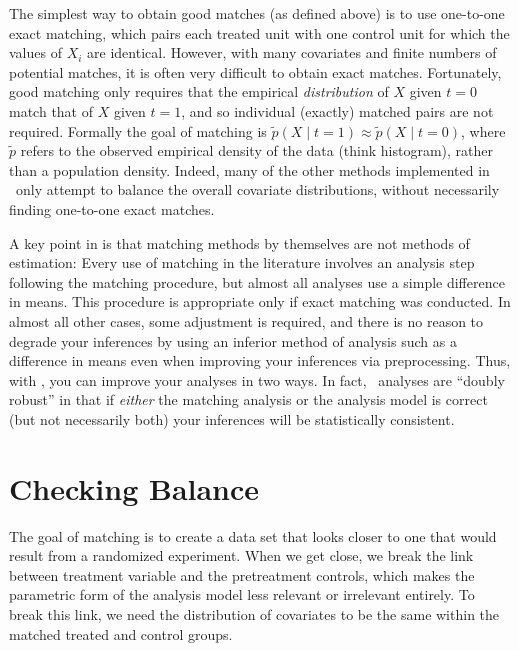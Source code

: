 The simplest way to obtain good matches (as defined above) is to use
one-to-one exact matching, which pairs each treated unit with one
control unit for which the values of $X_i$ are identical.  However,
with many covariates and finite numbers of potential matches, it is
often very difficult to obtain exact matches.  Fortunately, good
matching only requires that the empirical \emph{distribution} of $X$
given $t=0$ match that of $X$ given $t=1$, and so individual (exactly)
matched pairs are not required.  Formally the goal of matching is
$\tilde p(X\mid t=1) \approx \tilde p(X\mid t=0)$, where $\tilde p$
refers to the observed empirical density of the data (think
histogram), rather than a population density.  Indeed, many of the
other methods implemented in \MatchIt\ only attempt to balance the
overall covariate distributions, without necessarily finding
one-to-one exact matches.

A key point in \citet*{HoImaKin05} is that matching methods by
themselves are not methods of estimation: Every use of matching in the
literature involves an analysis step following the matching procedure,
but almost all analyses use a simple difference in means.  This
procedure is appropriate only if exact matching was conducted.  In
almost all other cases, some adjustment is required, and there is no
reason to degrade your inferences by using an inferior method of
analysis such as a difference in means even when improving your
inferences via preprocessing.  Thus, with \MatchIt, you can improve
your analyses in two ways.  In fact, \MatchIt\ analyses are ``doubly
robust'' in that if \emph{either} the matching analysis or the
analysis model is correct (but not necessarily both) your inferences
will be statistically consistent.

\section{Checking Balance}
\label{sec:balance-sum}

The goal of matching is to create a data set that looks closer to one
that would result from a randomized experiment.  When we get close, we
break the link between treatment variable and the pretreatment
controls, which makes the parametric form of the analysis model less
relevant or irrelevant entirely.  To break this link, we need the
distribution of covariates to be the same within the matched treated
and control groups.


